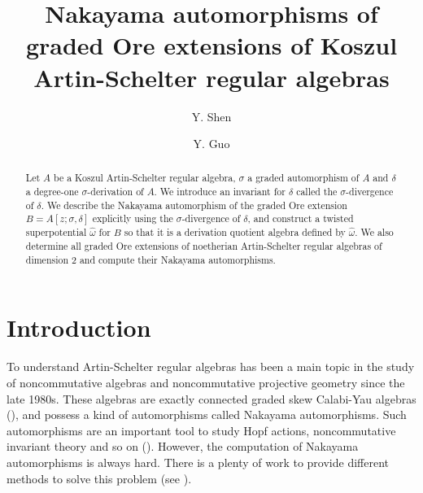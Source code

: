 \documentclass[a4paper,10pt]{amsart}
\theoremstyle{definition}
\numberwithin{equation}{section}
\begin{document}

\title{Nakayama automorphisms of graded Ore extensions of Koszul Artin-Schelter regular algebras
}

\author{Y. Shen}
\address{Shen: Department of Mathematics, Zhejiang Sci-Tech University, Hangzhou 310018, China}

\author{Y. Guo}
\address{Guo: Department of Mathematics, Zhejiang Sci-Tech University, Hangzhou 310018, China}




\date{}

\begin{abstract}
Let $A$ be a Koszul Artin-Schelter regular algebra, $\sigma$ a graded automorphism of $A$ and $\delta$ a degree-one $\sigma$-derivation of $A$. We introduce an invariant for $\delta$ called the $\sigma$-divergence of $\delta$. We describe the Nakayama automorphism of the graded Ore extension $B=A[z;\sigma,\delta]$ explicitly using the $\sigma$-divergence of $\delta$, and construct a twisted superpotential $\hat{\omega}$ for $B$ so that it is a derivation quotient algebra defined by $\hat{\omega}$. We also determine all graded Ore extensions of noetherian Artin-Schelter regular algebras of dimension 2 and compute their Nakayama automorphisms.
\end{abstract}






\maketitle

\section*{Introduction}
To understand Artin-Schelter regular algebras has been a main topic in the study of noncommutative algebras and noncommutative projective geometry since the late 1980s. These algebras are exactly  connected graded skew Calabi-Yau algebras (\cite{RRZ1}), and possess a kind of automorphisms called Nakayama automorphisms. Such automorphisms are an important tool to study  Hopf actions, noncommutative invariant theory and so on (\cite{CWZ,LMZ,RRZ2,SL}). However, the computation of Nakayama automorphisms is always hard. There is a plenty of work to provide different methods to solve this problem (see \cite{HVZ,LM,LWW,LMZ,LMZ1,RRZ1,RRZ2,SL,SZL,V,ZSL,ZVZ}).
\end{document}
